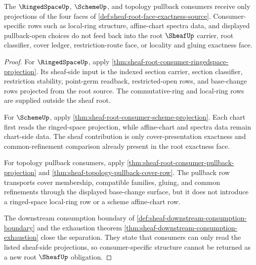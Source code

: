 \begin{theorem}
\label{thm:sheaf-root-face-downstream-separation}
The $\RingedSpaceUp$, $\SchemeUp$, and topology pullback consumers receive only projections of the four faces of \autoref{def:sheaf-root-face-exactness-source}. Consumer-specific rows such as local-ring structure, affine-chart spectra data, and displayed pullback-open choices do not feed back into the root $\SheafUp$ carrier, root classifier, cover ledger, restriction-route face, or locality and gluing exactness face.
\end{theorem}
\begin{proof}
For $\RingedSpaceUp$, apply \autoref{thm:sheaf-root-consumer-ringedspace-projection}. Its sheaf-side input is the indexed section carrier, section classifier, restriction stability, point-germ readback, restricted-open rows, and base-change rows projected from the root source. The commutative-ring and local-ring rows are supplied outside the sheaf root.

For $\SchemeUp$, apply \autoref{thm:sheaf-root-consumer-scheme-projection}. Each chart first reads the ringed-space projection, while affine-chart and spectra data remain chart-side data. The sheaf contribution is only cover-presentation exactness and common-refinement comparison already present in the root exactness face.

For topology pullback consumers, apply \autoref{thm:sheaf-root-consumer-pullback-projection} and \autoref{thm:sheaf-topology-pullback-cover-row}. The pullback row transports cover membership, compatible families, gluing, and common refinements through the displayed base-change surface, but it does not introduce a ringed-space local-ring row or a scheme affine-chart row.

The downstream consumption boundary of \autoref{def:sheaf-downstream-consumption-boundary} and the exhaustion theorem \autoref{thm:sheaf-downstream-consumption-exhaustion} close the separation. They state that consumers can only read the listed sheaf-side projections, so consumer-specific structure cannot be returned as a new root $\SheafUp$ obligation.
\end{proof}
